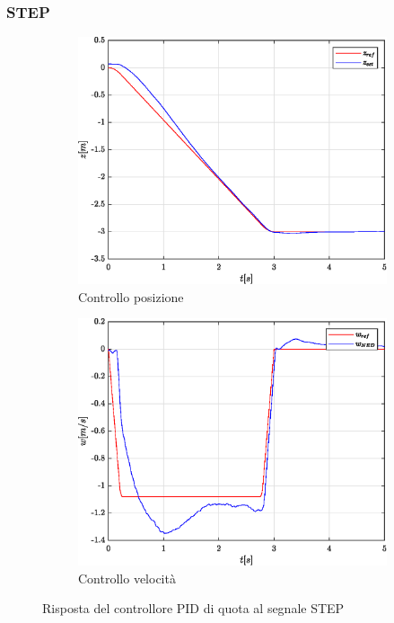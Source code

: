 \subsubsection{STEP}
\begin{figure}
	\centering
	\begin{subfigure}{0.45\textwidth}
		\centering
		\includegraphics[width=1\textwidth]{Simulazioni/Figure/PID/STEP/AltitudeControlPos}
		\caption{Controllo posizione}
		\label{fig:STEPerrposzPID}
	\end{subfigure}
	\hfill
	\begin{subfigure}{0.45\textwidth}
		\centering
		\includegraphics[width=1\textwidth]{Simulazioni/Figure/PID/STEP/AltitudeControlVel}
		\caption{Controllo velocità}
	\end{subfigure}
	\caption{Risposta del controllore PID di quota al segnale STEP}
	\label{fig:STEPerrvelzPID}
\end{figure}

